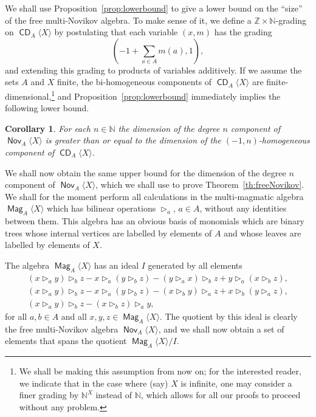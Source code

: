 \documentclass[10pt,a4paper]{article}
\newtheorem{corollary}[theo]{Corollary}
\theoremstyle{definition}
\numberwithin{equation}{section}
\numberwithin{figure}{section}
\newcommand{\bbN}{\mathbb{N}}
\newcommand{\bbZ}{\mathbb{Z}}
\DeclareMathOperator{\CDi}{\mathsf{CD}}
\DeclareMathOperator{\Nov}{\mathsf{Nov}}
\DeclareMathOperator{\Mag}{\mathsf{Mag}}
\begin{document}
We shall use Proposition~\ref{prop:lowerbound} to give a lower bound on the ``size'' of the free multi-Novikov algebra. To make sense of it, we define a $\bbZ\times \bbN$-grading on $\CDi_A\langle X\rangle$ by postulating that each variable $(x,m)$ has the grading
\[
\left(-1+\sum_{a\in A}m(a),1\right),
\]
and extending this grading to products of variables additively. If we assume the sets $A$ and $X$ finite, the bi-homogeneous components of $\CDi_A\langle X\rangle$ are finite-dimensional,\footnote{We shall be making this assumption from now on; for the interested reader, we indicate that in the case where (say) $X$ is infinite, one may consider a finer grading by $\bbN^X$ instead of $\bbN$, which allows for all our proofs to proceed without any problem.} and Proposition~\ref{prop:lowerbound} immediately implies the following lower bound.

\begin{corollary}\label{lower_bound}
For each $n\in\bbN$ the dimension of the degree $n$ component of $\Nov_A\langle X\rangle$ is greater than or equal to the dimension of the $(-1,n)$-homogeneous component of $\CDi_A\langle X\rangle$.
\end{corollary}

We shall now obtain the same upper bound for the dimension of the degree $n$ component of $\Nov_A\langle X\rangle$, which we shall use to prove Theorem~\ref{th:freeNovikov}. We shall for the moment perform all calculations in the multi-magmatic algebra $\Mag_A\langle X\rangle$ which has bilinear operations $\triangleright_a$, $a\in A$, without any identities between them. This algebra has an obvious basis of monomials which are binary trees whose internal vertices are labelled by elements of $A$ and whose leaves are labelled by elements of $X$.

The algebra $\Mag_A\langle X\rangle$ has an ideal $I$ generated by all elements
\begin{gather}
(x \triangleright_a y) \triangleright_b z - x \triangleright_a (y \triangleright_b z) - (y \triangleright_a x) \triangleright_b z + y \triangleright_a (x \triangleright_b z),
\\ (x \triangleright_a y) \triangleright_b z - x \triangleright_a (y \triangleright_b z) - (x\triangleright_b y) \triangleright_a z + x \triangleright_b (y \triangleright_a z),
\\ (x \triangleright_a y) \triangleright_b z - (x \triangleright_b z)\triangleright_a y,
\end{gather}
for all $ a,b\in A$ and all $x,y,z\in \Mag_A\langle X\rangle$. The quotient by this ideal is clearly the free multi-Novikov algebra $\Nov_A\langle X\rangle$, and we shall now obtain a set of elements that spans the quotient $\Mag_A\langle X\rangle/I$.
\end{document}
